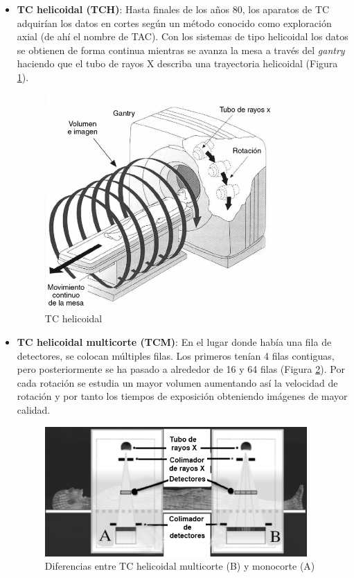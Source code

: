 \begin{itemize}
	\item \textbf{TC helicoidal (TCH)}: Hasta finales de los años 80, los aparatos de TC adquirían los datos en cortes según un método conocido como exploración axial (de ahí el nombre de TAC). Con los sistemas de tipo helicoidal los datos se obtienen de forma continua mientras se avanza la mesa a través del \textit{gantry} haciendo que el tubo de rayos X describa una trayectoria helicoidal (Figura \ref{fig:introduccion/tch}).
	
	\begin{figure}[H]
		\centering
		\includegraphics[width=9cm]{imagenes/introduccion/tch}
		\caption{TC helicoidal \cite{garcia14}}
		\label{fig:introduccion/tch}
	\end{figure}
	
	\item \textbf{TC helicoidal multicorte (TCM)}: En el lugar donde había una fila de detectores, se colocan múltiples filas. Los primeros tenían 4 filas contiguas, pero posteriormente se ha pasado a alrededor de 16 y 64 filas (Figura \ref{fig:introduccion/tcm}). Por cada rotación se estudia un mayor volumen aumentando así la velocidad de rotación y por tanto los tiempos de exposición obteniendo imágenes de mayor calidad.
	
	\begin{figure}[H]
		\centering
		\includegraphics[width=10cm]{imagenes/introduccion/tcm}
		\caption{Diferencias entre TC helicoidal multicorte (B) y monocorte (A) \cite{sarrio16}}
		\label{fig:introduccion/tcm}
	\end{figure}


\end{itemize}
